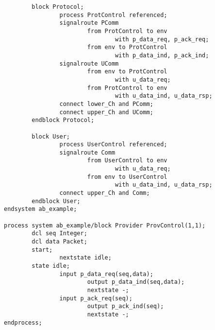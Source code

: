 \begin{verbatim}
        block Protocol;
                process ProtControl referenced;
                signalroute PComm
                        from ProtControl to env
                                with p_data_req, p_ack_req;
                        from env to ProtControl
                                with p_data_ind, p_ack_ind;
                signalroute UComm
                        from env to ProtControl
                                with u_data_req;
                        from ProtControl to env
                                with u_data_ind, u_data_rsp;
                connect lower_Ch and PComm;
                connect upper_Ch and UComm;
        endblock Protocol;

        block User;
                process UserControl referenced;
                signalroute Comm
                        from UserControl to env
                                with u_data_req;
                        from env to UserControl
                                with u_data_ind, u_data_rsp;
                connect upper_Ch and Comm;
        endblock User;
endsystem ab_example;

process system ab_example/block Provider ProvControl(1,1);
        dcl seq Integer;
        dcl data Packet;
        start;
                nextstate idle;
        state idle;
                input p_data_req(seq,data);
                        output p_data_ind(seq,data);
                        nextstate -;
                input p_ack_req(seq);
                        output p_ack_ind(seq);
                        nextstate -;
endprocess;
\end{verbatim}
\newpage
